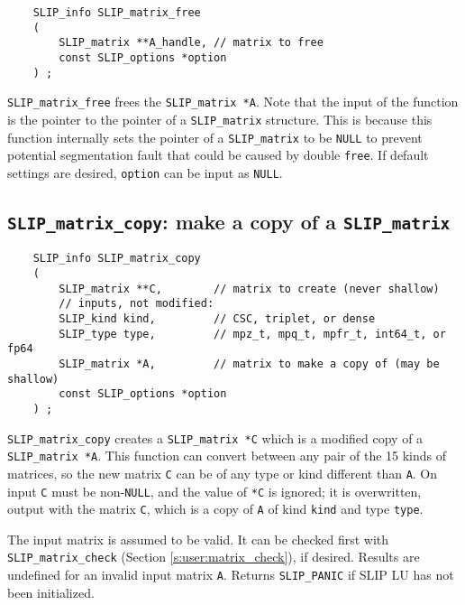 \documentclass[12pt]{article}
\theoremstyle{definition}
\begin{document}
\begin{mdframed}[userdefinedwidth=6in]
{\footnotesize
\begin{verbatim}
    SLIP_info SLIP_matrix_free
    (
        SLIP_matrix **A_handle, // matrix to free
        const SLIP_options *option
    ) ;
\end{verbatim}
} \end{mdframed}

\verb|SLIP_matrix_free| frees the \verb|SLIP_matrix *A|.  Note that the input
of the function is the pointer to the pointer of a \verb|SLIP_matrix|
structure. This is because this function internally sets the pointer of a
\verb|SLIP_matrix| to be \verb|NULL| to prevent potential segmentation fault
that could be caused by double \verb|free|.  If default settings are desired,
\verb|option| can be input as \verb|NULL|.

\cprotect\subsection{\verb|SLIP_matrix_copy|: make a copy of a \verb|SLIP_matrix|}
\label{s:user:matrix_copy}

\begin{mdframed}[userdefinedwidth=6in]
{\footnotesize
\begin{verbatim}
    SLIP_info SLIP_matrix_copy
    (
        SLIP_matrix **C,        // matrix to create (never shallow)
        // inputs, not modified:
        SLIP_kind kind,         // CSC, triplet, or dense
        SLIP_type type,         // mpz_t, mpq_t, mpfr_t, int64_t, or fp64
        SLIP_matrix *A,         // matrix to make a copy of (may be shallow)
        const SLIP_options *option
    ) ;
\end{verbatim}
} \end{mdframed}

\verb|SLIP_matrix_copy| creates a \verb|SLIP_matrix *C| which is a modified
copy of a \verb|SLIP_matrix *A|. This function can convert between any pair of
the 15 kinds of matrices, so the new matrix \verb|C| can be of any type or kind
different than \verb|A|.  On input \verb|C| must be non-\verb|NULL|, and the
value of \verb|*C| is ignored; it is overwritten, output with the matrix
\verb|C|, which is a copy of \verb|A| of kind \verb|kind| and type \verb|type|.

The input matrix is assumed to be valid. It can be checked first with
\verb|SLIP_matrix_check| (Section \ref{s:user:matrix_check}), if desired.
Results are undefined for an invalid input matrix \verb|A|.  Returns
\verb|SLIP_PANIC| if SLIP LU has not been initialized.
\end{document}
